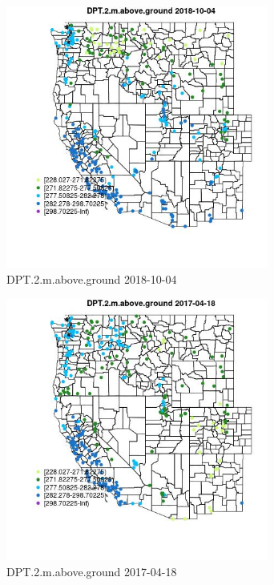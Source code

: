 \begin{figure} 
\centering  
\includegraphics[width=0.77\textwidth]{Code_Outputs/Report_ML_input_PM25_Step4_part_f_de_duplicated_aveswNAs_MapObsDPT2maboveground2018-10-04.jpg} 
\caption{\label{fig:Report_ML_input_PM25_Step4_part_f_de_duplicated_aveswNAsMapObsDPT2maboveground2018-10-04}DPT.2.m.above.ground 2018-10-04} 
\end{figure} 
 

\begin{figure} 
\centering  
\includegraphics[width=0.77\textwidth]{Code_Outputs/Report_ML_input_PM25_Step4_part_f_de_duplicated_aveswNAs_MapObsDPT2maboveground2017-04-18.jpg} 
\caption{\label{fig:Report_ML_input_PM25_Step4_part_f_de_duplicated_aveswNAsMapObsDPT2maboveground2017-04-18}DPT.2.m.above.ground 2017-04-18} 
\end{figure} 
 

